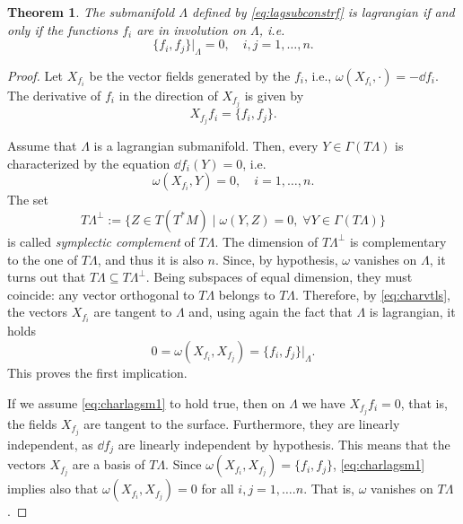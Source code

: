 \documentclass[english,fontsize=11pt,paper=b5]{scrbook}
\numberwithin{equation}{chapter}
\newtheorem{theorem}{Theorem}[chapter]
\theoremstyle{definition}
\begin{document}
    \begin{theorem}
      The submanifold $\Lambda$ defined by \eqref{eq:lagsubconstrf} is lagrangian if and only if the functions $f_i$ are in involution on $\Lambda$, i.e.
      \begin{equation}\label{eq:charlagsm1}
        \big\{f_i, f_j\big\}\big|_\Lambda = 0, \quad i,j = 1,\ldots,n.
      \end{equation}
    \end{theorem}
    \begin{proof}
      Let $X_{f_i}$ be the vector fields generated by the $f_i$, i.e., $\omega(X_{f_i}, \cdot)=-\dd f_i$. The derivative of $f_i$ in the direction of $X_{f_j}$ is given by
      \begin{equation}
        X_{f_j}f_i = \big\{f_i,f_j\big\}.
      \end{equation}

      Assume that $\Lambda$ is a lagrangian submanifold.
      Then, every $Y\in \Gamma(T\Lambda)$ is characterized by the equation $\dd f_i(Y) = 0$, i.e.
      \begin{equation}\label{eq:charvtls}
        \omega(X_{f_i}, Y) = 0, \quad i=1,\ldots,n.
      \end{equation}
      The set
      \begin{equation}
        T\Lambda^\perp := \big\{Z\in T(T^*M) \mid \omega(Y,Z) = 0, \; \forall Y\in \Gamma(T\Lambda)\big\}
      \end{equation}
      is called \emph{symplectic complement} of $T\Lambda$. The dimension of $T\Lambda^\perp$ is complementary to the one of $T\Lambda$, and thus it is also $n$. Since, by hypothesis, $\omega$ vanishes on $\Lambda$, it turns out that $T\Lambda \subseteq T\Lambda^\perp$. Being subspaces of equal dimension, they must coincide: any vector orthogonal to $T\Lambda$ belongs to $T\Lambda$.
      Therefore, by \eqref{eq:charvtls}, the vectors $X_{f_i}$ are tangent to $\Lambda$ and, using again the fact that $\Lambda$ is lagrangian, it holds
      \begin{equation}
        0 = \omega(X_{f_i}, X_{f_j}) = \big\{f_i, f_j\big\}\big|_\Lambda.
      \end{equation}
      This proves the first implication.

      If we assume \eqref{eq:charlagsm1} to hold true, then on $\Lambda$ we have $X_{f_j}f_i = 0$, that is, the fields $X_{f_j}$ are tangent to the surface. Furthermore, they are linearly independent, as $\dd f_j$ are linearly independent by hypothesis.
      This means that the vectors $X_{f_j}$ are a basis of $T\Lambda$.
      Since $\omega(X_{f_i}, X_{f_j}) = \big\{f_i,f_j\big\}$, \eqref{eq:charlagsm1} implies also that $\omega(X_{f_i}, X_{f_j}) = 0$ for all $i,j=1,\ldots.n$. That is, $\omega$ vanishes on $T\Lambda$.
    \end{proof}
\end{document}
